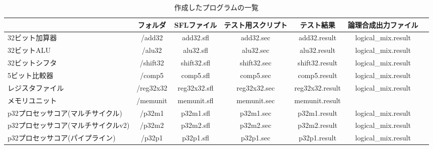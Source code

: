 \documentclass{jarticle}[11pt]
\newcommand{\lw}[1]{\smash{\lower2.ex\hbox{#1}}}
\begin{document}
\begin{table}[htb]

\caption{作成したプログラムの一覧}
\label{tab:作成したプログラムの一覧}
\begin{center}
{\tiny
\begin{tabular}{l|cccccc}
\hline
\hline
\lw{モジュール}
& フォルダ & SFLファイル & テスト用スクリプト & テスト結果 & 論理合成出力ファイル \\
\hline
32ビット加算器     & /add32 & add32.sfl & add32.sec & add32.result& logical\_mix.result\\
32ビットALU    & /alu32 & alu32.sfl & alu32.sec & alu32.result & logical\_mix.result\\
32ビットシフタ     & /shift32 & shift32.sfl & shift32.sec & shift32.result & logical\_mix.result\\
5ビット比較器     & /comp5 & comp5.sfl & comp5.sec & comp5.result & logical\_mix.result\\
レジスタファイル     & /reg32x32 & reg32x32.sfl & reg32x32.sec & reg32x32.result & logical\_mix.result\\
メモリユニット     & /memunit & memunit.sfl & memunit.sec & memunit.result & \\
p32プロセッサコア(マルチサイクル)   & /p32m1 & p32m1.sfl & p32m1.sec & p32m1.result & logical\_mix.result\\
p32プロセッサコア(マルチサイクルv2)   & /p32m2 & p32m2.sfl & p32m2.sec & p32m2.result & logical\_mix.result \\
p32プロセッサコア(パイプライン)   & /p32p1 & p32p1.sfl & p32p1.sec & p32p1.result & logical\_mix.result \\
\hline
\end{tabular}
}
\end{center}
\end{table}
\end{document}

